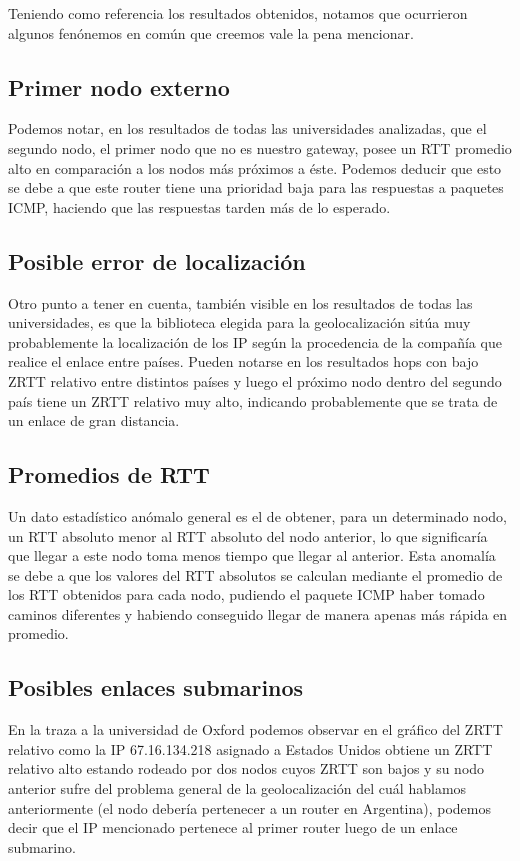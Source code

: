\documentclass[a4paper, 10pt, twoside]{article}
\begin{document}
Teniendo como referencia los resultados obtenidos, notamos que ocurrieron algunos fenónemos en común que creemos vale la pena mencionar.

\subsection{Primer nodo externo}
Podemos notar, en los resultados de todas las universidades analizadas, que el segundo nodo, el primer nodo que no es nuestro gateway, posee un RTT promedio alto en comparación a los nodos más próximos a éste. Podemos deducir que esto se debe a que este router tiene una prioridad baja para las respuestas a paquetes ICMP, haciendo que las respuestas tarden más de lo esperado.

\subsection{Posible error de localización}
Otro punto a tener en cuenta, también visible en los resultados de todas las universidades, es que la biblioteca elegida para la geolocalización sitúa muy probablemente la localización de los IP según la procedencia de la compañía que realice el enlace entre países. Pueden notarse en los resultados hops con bajo ZRTT relativo entre distintos países y luego el próximo nodo dentro del segundo país tiene un ZRTT relativo muy alto, indicando probablemente que se trata de un enlace de gran distancia.

\subsection{Promedios de RTT}
Un dato estadístico anómalo general es el de obtener, para un determinado nodo, un RTT absoluto menor al RTT absoluto del nodo anterior, lo que significaría que llegar a este nodo toma menos tiempo que llegar al anterior. Esta anomalía se debe a que los valores del RTT absolutos se calculan mediante el promedio de los RTT obtenidos para cada nodo, pudiendo el paquete ICMP haber tomado caminos diferentes y habiendo conseguido llegar de manera apenas más rápida en promedio.

\subsection{Posibles enlaces submarinos}
En la traza a la universidad de Oxford podemos observar en el gráfico del ZRTT relativo como la IP 67.16.134.218 asignado a Estados Unidos obtiene un ZRTT relativo alto estando rodeado por dos nodos cuyos ZRTT son bajos y su nodo anterior sufre del problema general de la geolocalización del cuál hablamos anteriormente (el nodo debería pertenecer a un router en Argentina), podemos decir que el IP mencionado pertenece al primer router luego de un enlace submarino.
 
\end{document}
